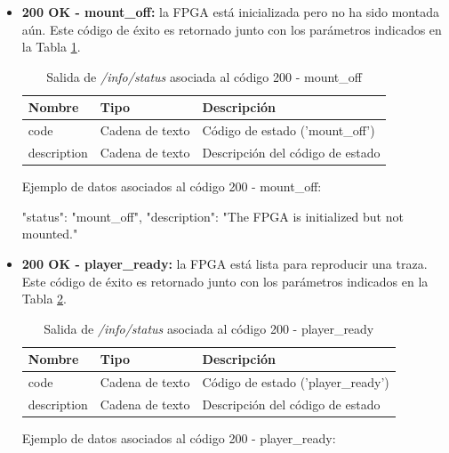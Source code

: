 \begin{itemize}
{\begin{minipage}{\textwidth}
\begin{code}[language=json]
{
  "status": "init_off",
  "description": "The FPGA is not configured either as player or as recorder yet."
}
\end{code}
\end{minipage}
}

\item{\textbf{200 OK - mount\_off:} la \gls{FPGA} está inicializada pero no ha sido montada aún. Este código de éxito es retornado junto con los parámetros indicados en la Tabla \ref{extra:api:infostatus:mountoff}.
\begin{table}[H]
\centering
\begin{tabular}{|l|l|l|}
\hline
\rowcolor[HTML]{F5F5F5}
\textbf{Nombre}  & \textbf{Tipo}   & \textbf{Descripción}               \\ \hline
code             & Cadena de texto & Código de estado ('mount\_off')    \\ \hline
description      & Cadena de texto & Descripción del código de estado   \\ \hline
\end{tabular}
\caption{Salida de \textit{/info/status} asociada al código 200 - mount\_off}
\label{extra:api:infostatus:mountoff}
\end{table}
\begin{minipage}{\textwidth}
Ejemplo de datos asociados al código 200 - mount\_off:

\begin{code}[language=json]
{
  "status": "mount_off",
  "description": "The FPGA is initialized but not mounted."
}
\end{code}
\end{minipage}
}

\item{\textbf{200 OK - player\_ready:} la \gls{FPGA} está lista para reproducir una \gls{traza}. Este código de éxito es retornado junto con los parámetros indicados en la Tabla \ref{extra:api:infostatus:playerready}.
\begin{table}[H]
\centering
\begin{tabular}{|l|l|l|}
\hline
\rowcolor[HTML]{F5F5F5}
\textbf{Nombre}  & \textbf{Tipo}   & \textbf{Descripción}               \\ \hline
code             & Cadena de texto & Código de estado ('player\_ready') \\ \hline
description      & Cadena de texto & Descripción del código de estado   \\ \hline
\end{tabular}
\caption{Salida de \textit{/info/status} asociada al código 200 - player\_ready}
\label{extra:api:infostatus:playerready}
\end{table}
\begin{minipage}{\textwidth}
Ejemplo de datos asociados al código 200 - player\_ready:


\end{minipage}}
\end{itemize}
